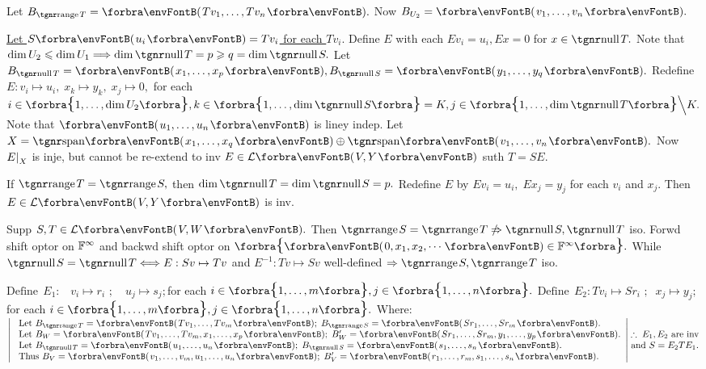  \;Let $B_{\range T}=\Par{Tv_1,\dots,Tv_n}.$ Now $B_{U_2}=\Par{v_1,\dots,v_n}.$\par\quad
\uline{Let $S\Par{u_i}=Tv_i$ for each $Tv_i.$} \;Define $E$ with each $Ev_i=u_i,Ex=0$ for $x\in\null T.$\PfEnd\vspace{4pt}\quad
\AComm {} \;Note that $\dim U_2\leqslant\dim U_1\Longrightarrow\dim\null T=p\geqslant q=\dim\null S.$\parCom\quad
Let $B_{\null T}=\Par{x_1,\dots,x_p},B_{\null S}=\Par{y_1,\dots,y_q}.$ Redefine $E:v_i\mapsto u_i,\;x_k\mapsto y_k,\;x_j\mapsto 0,$\parCom\quad
for each $i\in\Bra{1,\dots,\dim U_2},k\in\Bra{1,\dots,\dim\null S}=K,j\in\Bra{1,\dots,\dim\null T}\Backslash[\Big]K.$\parCom\quad
Note that $\Par{u_1,\dots,u_n}$ is liney indep. Let $X=\Span{x_1,\dots,x_q}\oplus\Span{v_1,\dots,v_n}.$\parCom\quad
Now $E\text{\normalsize|}_X$ is inje, but cannot be re-extend to inv $E\in\Lm{V,Y}$ suth $T=SE.$\par{}\vspace{4pt}\quad
\ACoro {} \;If $\range T=\range S,$ then $\dim\null T=\dim\null S=p.$\parCor\quad
Redefine $E$ by $Ev_i=u_i,\;Ex_j=y_j$ for each $v_i$ and $x_j.$ Then $E\in\Lm{V,Y}$ is inv.\PfEnd
\SepLine

\BulletPointX\AComm Supp $S,T\in\Lm{V,W}.$ Then $\range S=\range T\notRightarrow\null S,\null T$ iso.\TextB{}
\AExa Forwd shift optor on ${\mathbb{F}}^{\infty}$ and backwd shift optor on $\Bra{\Par{0,x_1,x_2,\cdots}\in\Fbb^{\infty}}.$\TextB{\vspace{2pt}}
While $\null S=\null T\Longleftrightarrow E:Sv\mapsto Tv$ and $E^{-1}:Tv\mapsto Sv$ well-defined $\Rightarrow \range S,\range T$ iso.
\SepLine

$\text{Define}\;\,E_1:\,\,\,\,\, v_i\mapsto r_i\,\,;\quad u_j\mapsto s_j;$\quad for each $i\in\Bra{1,\dots,m},j\in\Bra{1,\dots,n}.$\parSol{}
$\text{Define}\;\,E_2:Tv_i\mapsto Sr_i\,\,;\;\;x_j\mapsto y_j;$\quad for each $i\in\Bra{1,\dots,m},j\in\Bra{1,\dots,n}.$
Where:\parSol{\vspace{2pt}}
$\MathLeftrightMid{l}{$
	Let $B_{\range T}=\Par{Tv_1,\dots,Tv_m};\;B_{\range S}=\Par{Sr_1,\dots,Sr_m}.\\ $
	Let $B_W=\Par{Tv_1,\dots,Tv_m,x_1,\dots,x_p};\;B_W'=\Par{Sr_1,\dots,Sr_m,y_1,\dots,y_p}.\\ $
	Let $B_{\null T}=\Par{u_1,\dots,u_n};\;B_{\null S}=\Par{s_1,\dots,s_n}.\\ $
	Thus $B_V=\Par{v_1,\dots,v_m,u_1,\dots,u_n};\;B_V'=\Par{r_1,\dots,r_m,s_1,\dots,s_n}.}\hMath{c}{}{}{\therefore\;E_1,E_2$ are inv$ \\ $and $S=E_2 TE_1.}$\PfEnd
\SepLine[0pt][\Blind{\BulletPointX} ]

